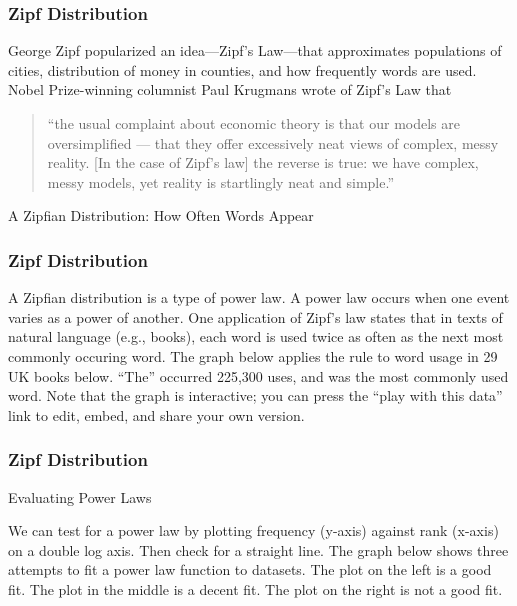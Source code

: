 \documentclass{beamer}
\begin{document}
\begin{frame}
\frametitle{Zipf Distribution}
George Zipf popularized an idea—Zipf’s Law—that approximates populations of cities, distribution of money in counties, and how frequently words are used. Nobel Prize-winning columnist Paul Krugmans wrote of Zipf’s Law that
\begin{quote}
“the usual complaint about economic theory is that our models are oversimplified — that they offer excessively neat views of complex, messy reality. [In the case of Zipf’s law] the reverse is true: we have complex, messy models, yet reality is startlingly neat and simple.”

\end{quote}

A Zipfian Distribution: How Often Words Appear

\end{frame}

\begin{frame}
\frametitle{Zipf Distribution}
A Zipfian distribution is a type of power law. A power law occurs when one event varies as a power of another. One application of Zipf’s law states that in texts of natural language (e.g., books), each word is used twice as often as the next most commonly occuring word. The graph below applies the rule to word usage in 29 UK books below. “The” occurred 225,300 uses, and was the most commonly used word. Note that the graph is interactive; you can press the “play with this data” link to edit, embed, and share your own version. 

\end{frame}

\begin{frame}
\frametitle{Zipf Distribution}

Evaluating Power Laws



We can test for a power law by plotting frequency (y-axis) against rank (x-axis) on a double log axis. Then check for a straight line. The graph below shows three attempts to fit a power law function to datasets. The plot on the left is a good fit. The plot in the middle is a decent fit. The plot on the right is not a good fit. 

\end{frame}
\end{document}
